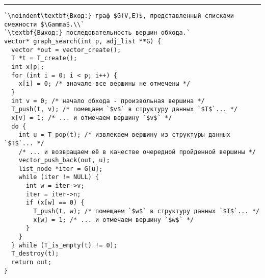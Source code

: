 \documentclass{article}
\begin{document}
\vspace{5pt} \hrule
\begin{lstlisting}[caption={Поиск в ширину и в глубину}, label=p258_graph_search, escapechar=`]
`\noindent\textbf{Вход:} граф $G(V,E)$, представленный списками смежности $\Gamma$.\\`
`\textbf{Выход:} последовательность вершин обхода.`
vector* graph_search(int p, adj_list **G) {
  vector *out = vector_create();
  T *t = T_create();
  int x[p];
  for (int i = 0; i < p; i++) {
    x[i] = 0; /* вначале все вершины не отмечены */
  }
  int v = 0; /* начало обхода - произвольная вершина */
  T_push(t, v); /* помещаем `$v$` в структуру данных `$T$`... */
  x[v] = 1; /* ... и отмечаем вершину `$v$` */
  do {
    int u = T_pop(t); /* извлекаем вершину из структуры данных `$T$`... */
    /* ... и возвращаем её в качестве очередной пройденной вершины */
    vector_push_back(out, u);
    list_node *iter = G[u];
    while (iter != NULL) {
      int w = iter->v;
      iter = iter->n;
      if (x[w] == 0) {
        T_push(t, w); /* помещаем `$w$` в структуру данных `$T$`... */
        x[w] = 1; /* ... и отмечаем вершину `$w$` */
      }
    }
  } while (T_is_empty(t) != 0);
  T_destroy(t);
  return out;
}
\end{lstlisting}
\end{document}
